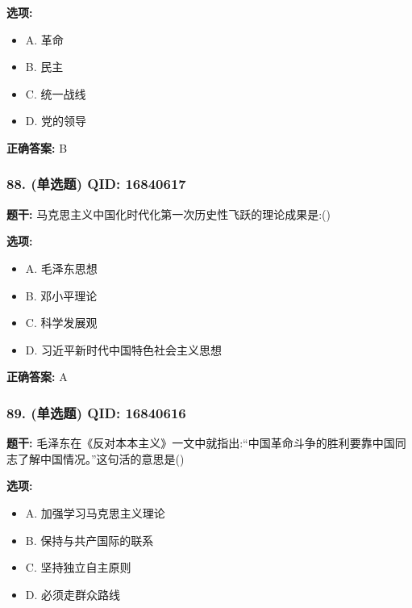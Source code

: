 \documentclass[12pt,UTF8]{ctexart}
\begin{document}
\textbf{选项:}
\begin{itemize}[leftmargin=*]

  \item A. 革命

  \item B. 民主

  \item C. 统一战线

  \item D. 党的领导

\end{itemize}

\textbf{正确答案:}
B

\vspace{0.3em}\hrulefill\vspace{0.7em}

\subsubsection*{88. (单选题) \small QID: 16840617}

\textbf{题干:}
马克思主义中国化时代化第一次历史性飞跃的理论成果是:()

\textbf{选项:}
\begin{itemize}[leftmargin=*]

  \item A. 毛泽东思想

  \item B. 邓小平理论

  \item C. 科学发展观

  \item D. 习近平新时代中国特色社会主义思想

\end{itemize}

\textbf{正确答案:}
A

\vspace{0.3em}\hrulefill\vspace{0.7em}

\subsubsection*{89. (单选题) \small QID: 16840616}

\textbf{题干:}
毛泽东在《反对本本主义》一文中就指出:“中国革命斗争的胜利要靠中国同志了解中国情况。”这句活的意思是()

\textbf{选项:}
\begin{itemize}[leftmargin=*]

  \item A. 加强学习马克思主义理论

  \item B. 保持与共产国际的联系

  \item C. 坚持独立自主原则

  \item D. 必须走群众路线

\end{itemize}
\end{document}
